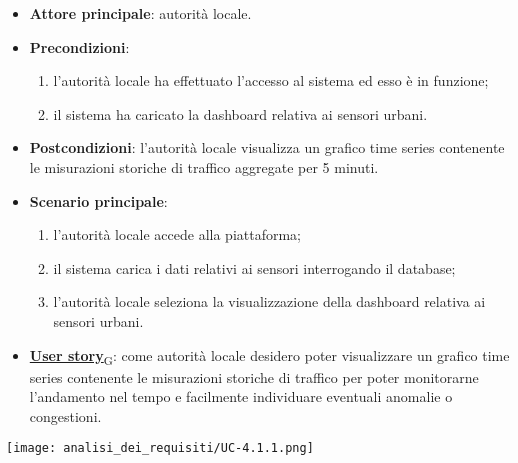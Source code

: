 \begin{itemize}
	\item \textbf{Attore principale}: autorità locale.
	\item \textbf{Precondizioni}:
	      \begin{enumerate}
		      \item l'autorità locale ha effettuato l'accesso al sistema ed esso è in funzione;
		      \item il sistema ha caricato la dashboard relativa ai sensori urbani.
	      \end{enumerate}
	\item \textbf{Postcondizioni}: l'autorità locale visualizza un grafico time series contenente le misurazioni storiche di traffico aggregate per 5 minuti.
	\item \textbf{Scenario principale}:
	      \begin{enumerate}
		      \item l'autorità locale accede alla piattaforma;
		      \item il sistema carica i dati relativi ai sensori interrogando il database;
		      \item l'autorità locale seleziona la visualizzazione della dashboard relativa ai sensori urbani.
	      \end{enumerate}
	\item \href{https://7last.github.io/docs/pb/documentazione-interna/glossario\#user-story}{\textbf{User story}\textsubscript{G}}:
	      come autorità locale desidero poter visualizzare un grafico time series contenente le misurazioni storiche
	      di traffico per poter monitorarne l'andamento nel tempo e facilmente individuare eventuali anomalie
	      o congestioni.
\end{itemize}
\begin{center}
	\texttt{[image: analisi\_dei\_requisiti/UC-4.1.1.png]}
\end{center}


